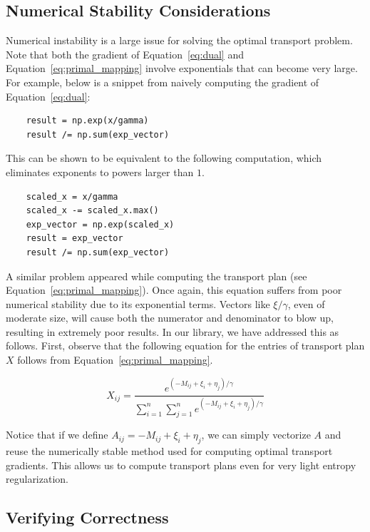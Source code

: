 \documentclass[journal]{IEEEtran}
\begin{document}
\subsection{Numerical Stability Considerations}

Numerical instability is a large issue for solving the optimal transport problem. Note that both the gradient of Equation~\ref{eq:dual} and Equation~\ref{eq:primal_mapping} involve exponentials that can become very large. For example, below is a snippet from naively computing the gradient of Equation~\ref{eq:dual}: 

\begin{verbatim}
    result = np.exp(x/gamma)
    result /= np.sum(exp_vector)
\end{verbatim}

This can be shown to be equivalent to the following computation, which eliminates exponents to powers larger than $1$.

\begin{verbatim}
    scaled_x = x/gamma
    scaled_x -= scaled_x.max()
    exp_vector = np.exp(scaled_x)
    result = exp_vector
    result /= np.sum(exp_vector)
\end{verbatim}

A similar problem appeared while computing the transport plan (see Equation~\ref{eq:primal_mapping}). Once again, this equation suffers from poor numerical stability due to its exponential terms. Vectors like $\xi/\gamma$, even of moderate size, will cause both the numerator and denominator to blow up, resulting in extremely poor results. In our library, we have addressed this as follows. First, observe that the following equation for the entries of transport plan $X$ follows from Equation~\ref{eq:primal_mapping}.

\begin{equation}
    X_{ij} = \frac{e^{(-M_{ij}+\xi_i+\eta_j)/\gamma}}{\sum_{i=1}^n \sum_{j=1}^n e^{(-M_{ij}+\xi_i+\eta_j)/\gamma}}
\end{equation}

Notice that if we define $A_{ij}=-M_{ij}+\xi_i+\eta_j$, we can simply vectorize $A$ and reuse the numerically stable method used for computing optimal transport gradients. This allows us to compute transport plans even for very light entropy regularization.

\subsection{Verifying Correctness}
\end{document}
